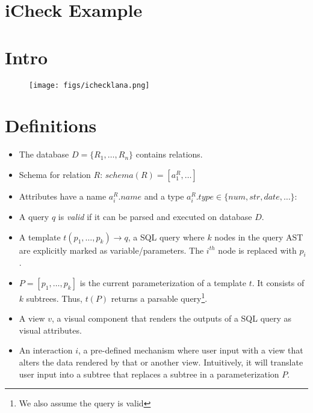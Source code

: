 \clearpage
\section*{iCheck Example}

\section{Intro}

\begin{figure}[h!]
    \centering
    \texttt{[image: figs/ichecklana.png]}
    \label{f:icheck}
\end{figure}


\section{Definitions}
\begin{itemize}
  \item The database $D = \{R_1,\ldots,R_n\}$ contains relations.
  \item Schema for relation $R$: $schema(R) = [a^R_1, \ldots]$
  \item Attributes have a name $a^R_i.name$ and a type $a^R_i.type\in\{num,str,date,\ldots\}$: 
  \item A query $q$ is {\it valid} if it can be parsed and executed on database $D$.
  \item A template $t(p_1,\ldots,p_k) \to q$, a SQL query where $k$ nodes in the query AST are explicitly marked as variable/parameters.   
    The $i^{th}$ node is replaced with $p_i$.
  \item $P = [p_1,\ldots, p_k]$ is the current parameterization of a template $t$.  It consists of $k$ subtrees.
    Thus,  $t(P)$ returns a parsable query\footnote{We also assume the query is valid}.  
  \item A view $v$, a visual component that renders the outputs of a SQL query as visual attributes.  
  \item An interaction $i$, a pre-defined mechanism where user input with a view that alters the data rendered by that or another view.
    Intuitively, it will translate user input into a subtree that replaces a subtree in a parameterization $P$.
 \end{itemize}

